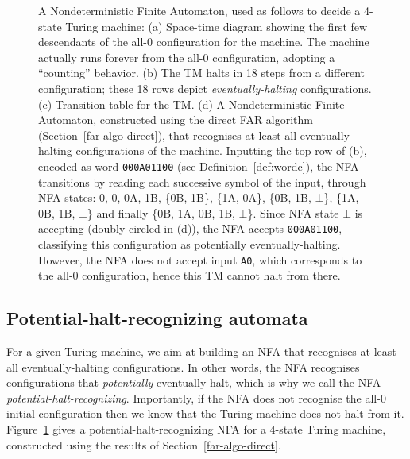 \begin{figure}
  \caption{\small A Nondeterministic Finite Automaton, used as follows to decide a 4-state Turing machine\protect\footnotemark:
    (a) Space-time diagram showing the first few descendants of the all-0 configuration for the machine. The machine actually runs forever from the all-0 configuration, adopting a ``counting'' behavior.
    (b) The TM halts in 18 steps from a different configuration; these 18 rows depict \emph{eventually-halting} configurations.
    (c) Transition table for the TM.
    (d) A Nondeterministic Finite Automaton, constructed using the direct FAR algorithm (Section~\ref{far-algo-direct}), that recognises at least all eventually-halting configurations of the machine. Inputting the top row of (b), encoded as word \texttt{000A01100} (see Definition~\ref{def:wordc}), the NFA transitions by reading each successive symbol of the input, through NFA states: 0, 0, 0A, 1B, \{0B, 1B\}, \{1A, 0A\}, \{0B, 1B, $\bot$\}, \{1A, 0B, 1B, $\bot$\} and finally \{0B, 1A, 0B, 1B, $\bot$\}. Since NFA state $\bot$ is accepting (doubly circled in (d)), the NFA accepts \texttt{000A01100}, classifying this configuration as potentially eventually-halting. However, the NFA does not accept input \texttt{A0}, which corresponds to the all-0 configuration, hence this TM cannot halt from there.}



  \label{fig:finite-automata-reduction}
\end{figure}


\subsection{Potential-halt-recognizing automata}
\newcommand{\M}{\mathcal{M}}
\newcommand{\T}{^T}
\newcommand{\row}{\text{row}}
\label{far-defs-recognizer}
For a given Turing machine, we aim at building an NFA that recognises at least all eventually-halting configurations. In other words, the NFA recognises configurations that \textit{potentially} eventually halt, which is why we call the NFA \textit{potential-halt-recognizing}. Importantly, if the NFA does not recognise the all-0 initial configuration then we know that the Turing machine does not halt from it. Figure~\ref{fig:finite-automata-reduction} gives a potential-halt-recognizing NFA for a 4-state Turing machine, constructed using the results of Section~\ref{far-algo-direct}.


